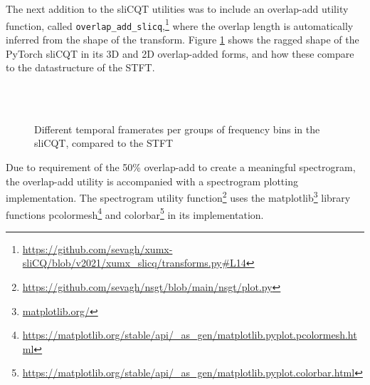 \documentclass[report.tex]{subfiles}
\begin{document}
The next addition to the sliCQT utilities was to include an overlap-add utility function, called \Verb#overlap_add_slicq#,\footnote{\url{https://github.com/sevagh/xumx-sliCQ/blob/v2021/xumx_slicq/transforms.py\#L14}} where the overlap length is automatically inferred from the shape of the transform. Figure \ref{fig:slicqt3d} shows the ragged shape of the PyTorch sliCQT in its 3D and 2D overlap-added forms, and how these compare to the datastructure of the STFT.

\begin{figure}[ht]
	\centering
	\\
	\\
	\caption{Different temporal framerates per groups of frequency bins in the sliCQT, compared to the STFT}
	\label{fig:slicqt3d}
\end{figure}

Due to requirement of the 50\% overlap-add to create a meaningful spectrogram, the overlap-add utility is accompanied with a spectrogram plotting implementation.  The spectrogram utility function\footnote{\url{https://github.com/sevagh/nsgt/blob/main/nsgt/plot.py}} uses the matplotlib\footnote{\url{matplotlib.org/}} library functions pcolormesh\footnote{\url{https://matplotlib.org/stable/api/_as_gen/matplotlib.pyplot.pcolormesh.html}} and colorbar\footnote{\url{https://matplotlib.org/stable/api/_as_gen/matplotlib.pyplot.colorbar.html}} in its implementation.
\end{document}
